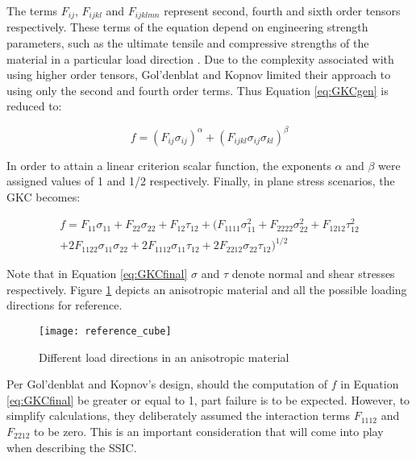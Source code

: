 \documentclass[main.tex]{subfiles}
\begin{document}
The terms $F_{ij}$, $F_{ijkl}$ and $F_{ijklmn}$ represent second, fourth and sixth order tensors respectively. These terms of the equation depend on engineering strength parameters, such as the ultimate tensile and compressive strengths of the material in a particular load direction \cite{Osswald2017a}. Due to the complexity associated with using higher order tensors, Gol'denblat and Kopnov limited their approach to using only the second and fourth order terms. Thus Equation \ref{eq:GKCgen} is reduced to:

\begin{equation} \label{eq:GKCgenTrunc}
f=(F_{ij}\sigma_{ij})^\alpha + (F_{ijkl}\sigma_{ij}\sigma_{kl})^\beta
\end{equation}

In order to attain a linear criterion scalar function, the exponents $\alpha$ and $\beta$ were assigned values of 1 and 1/2 respectively. Finally, in plane stress scenarios, the GKC becomes:

\begin{equation} \label{eq:GKCfinal}
\begin{split}
f=F_{11}\sigma_{11} + F_{22}\sigma_{22} + F_{12}\tau_{12} + (F_{1111}\sigma_{11}^{2} + F_{2222}\sigma_{22}^{2} + F_{1212}\tau_{12}^{2} \\ + 2F_{1122}\sigma_{11}\sigma_{22} + 2F_{1112}\sigma_{11}\tau_{12} + 2F_{2212}\sigma_{22}\tau_{12})^{1/2}
\end{split}
\end{equation}

Note that in Equation \ref{eq:GKCfinal} $\sigma$ and $\tau$ denote normal and shear stresses respectively. Figure \ref{fig:loaddir} depicts an anisotropic material and all the possible loading directions for reference.

\begin{figure}[h]
	\center
	\texttt{[image: reference\_cube]}
	\caption{Different load directions in an anisotropic material} \label{fig:loaddir}
\end{figure}

Per Gol'denblat and Kopnov's design, should the computation of $f$ in Equation \ref{eq:GKCfinal} be greater or equal to 1, part failure is to be expected. However, to simplify calculations, they deliberately assumed the interaction terms $F_{1112}$ and $F_{2212}$ to be zero. This is an important consideration that will come into play when describing the SSIC.
\end{document}
